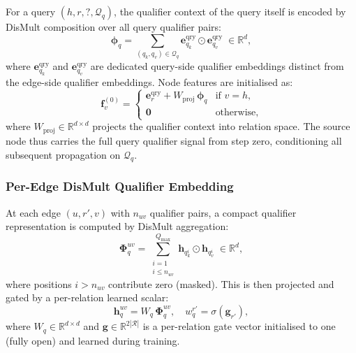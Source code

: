 \documentclass[10pt,journal,compsoc]{IEEEtran}
\begin{document}
For a query $(h, r, ?, \mathcal{Q}_q)$, the qualifier
context of the query itself is encoded by DisMult
composition over all query qualifier pairs:
\begin{equation}
  \boldsymbol{\phi}_q
  = \sum_{(q_k, q_v) \in \mathcal{Q}_q}
    \mathbf{e}_{q_k}^{\mathrm{qry}}
    \odot
    \mathbf{e}_{q_v}^{\mathrm{qry}}
  \;\in \mathbb{R}^d,
  \label{eq:hr_phi_query}
\end{equation}
where $\mathbf{e}_{q_k}^{\mathrm{qry}}$ and
$\mathbf{e}_{q_v}^{\mathrm{qry}}$ are dedicated
query-side qualifier embeddings distinct from the
edge-side qualifier embeddings.
Node features are initialised as:
\begin{equation}
  \mathbf{f}_v^{(0)} =
  \begin{cases}
    \mathbf{e}_r^{\mathrm{qry}}
    + W_{\mathrm{proj}}\,\boldsymbol{\phi}_q
    & \text{if } v = h, \\[4pt]
    \mathbf{0}
    & \text{otherwise,}
  \end{cases}
  \label{eq:hr_init}
\end{equation}
where $W_{\mathrm{proj}} \in \mathbb{R}^{d \times d}$
projects the qualifier context into relation space.
The source node thus carries the full query qualifier
signal from step zero, conditioning all subsequent
propagation on $\mathcal{Q}_q$.

\subsubsection{Per-Edge DisMult Qualifier Embedding}
\label{sssec:hr_edge_qual}

At each edge $(u, r', v)$ with $n_{uv}$ qualifier pairs,
a compact qualifier representation is computed by
DisMult aggregation:
\begin{equation}
  \boldsymbol{\Phi}_{q}^{uv}
  = \sum_{\substack{i=1 \\ i \leq n_{uv}}}^{Q_{\max}}
    \mathbf{h}_{q_k^i} \odot \mathbf{h}_{q_v^i}
  \;\in \mathbb{R}^d,
  \label{eq:hr_distmult}
\end{equation}
where positions $i > n_{uv}$ contribute zero (masked).
This is then projected and gated by a per-relation
learned scalar:
\begin{equation}
  \mathbf{h}_q^{uv}
  = W_q \, \boldsymbol{\Phi}_{q}^{uv},
  \quad
  w_q^{r'}
  = \sigma\!\left(\mathbf{g}_{r'}\right),
  \label{eq:hr_hq}
\end{equation}
where $W_q \in \mathbb{R}^{d \times d}$ and
$\mathbf{g} \in \mathbb{R}^{2|\mathcal{R}|}$ is a
per-relation gate vector initialised to one (fully open)
and learned during training.
\end{document}
